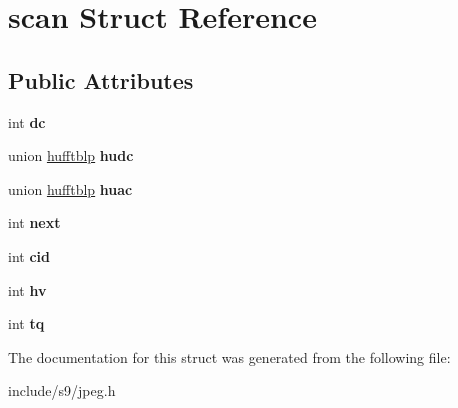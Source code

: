 \hypertarget{structscan}{\section{scan Struct Reference}
\label{structscan}
}
\subsection*{Public Attributes}
\begin{DoxyCompactItemize}
\item 
\hypertarget{structscan_a20d568126824e658b8d2a6db9dc875d1}{int {\bfseries dc}}\label{structscan_a20d568126824e658b8d2a6db9dc875d1}

\item 
\hypertarget{structscan_a4b18d515c95ecc74e15817074b051c4a}{union \hyperlink{unionhufftblp}{hufftblp} {\bfseries hudc}}\label{structscan_a4b18d515c95ecc74e15817074b051c4a}

\item 
\hypertarget{structscan_a39a7e1934b1342b6ff7ebf4f534d3577}{union \hyperlink{unionhufftblp}{hufftblp} {\bfseries huac}}\label{structscan_a39a7e1934b1342b6ff7ebf4f534d3577}

\item 
\hypertarget{structscan_a8fd802c04255c5f43e0f32fcfff92347}{int {\bfseries next}}\label{structscan_a8fd802c04255c5f43e0f32fcfff92347}

\item 
\hypertarget{structscan_a7df1db52d97afc270327e9eafdc65389}{int {\bfseries cid}}\label{structscan_a7df1db52d97afc270327e9eafdc65389}

\item 
\hypertarget{structscan_ad6747bd586ec218de4d8dc7ee08c0204}{int {\bfseries hv}}\label{structscan_ad6747bd586ec218de4d8dc7ee08c0204}

\item 
\hypertarget{structscan_ac3b43ed80ff59736df9f7d63c68048fc}{int {\bfseries tq}}\label{structscan_ac3b43ed80ff59736df9f7d63c68048fc}

\end{DoxyCompactItemize}


The documentation for this struct was generated from the following file\-:\begin{DoxyCompactItemize}
\item 
include/s9/jpeg.\-h\end{DoxyCompactItemize}
